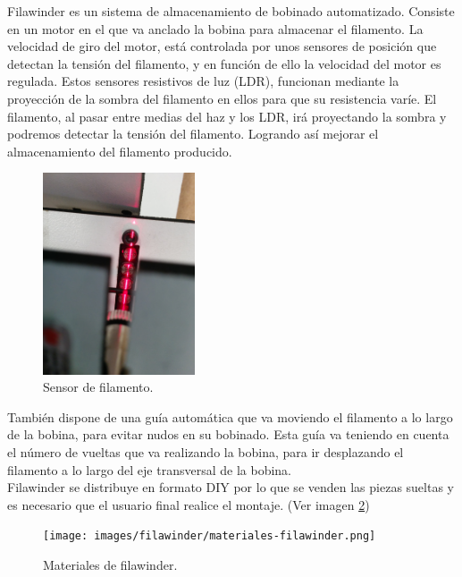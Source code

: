 Filawinder es un sistema de almacenamiento de bobinado automatizado. Consiste en un motor en el que va anclado la bobina para almacenar el filamento. La velocidad de giro del motor, está controlada por unos sensores de posición que detectan la tensión del filamento, y en función de ello la velocidad del motor es regulada. Estos sensores resistivos de luz (LDR), funcionan mediante la proyección de la sombra del filamento en ellos para que su resistencia varíe. El filamento, al pasar entre medias del haz y los LDR, irá proyectando la sombra y podremos detectar la tensión del filamento. Logrando así mejorar el almacenamiento del filamento producido.

    \begin{figure}[H]
            \centering
            \includegraphics[width=0.4\textwidth]{images/filawinder/Sensor-filamento.jpg}
            \caption{Sensor de filamento.}
            \label{fig:winder_sensor}
    \end{figure}

También dispone de una guía automática que va moviendo el filamento a lo largo de la bobina, para evitar nudos en su bobinado. Esta guía va teniendo en cuenta el número de vueltas que va realizando la bobina, para ir desplazando el filamento a lo largo del eje transversal de la bobina.\\

Filawinder se distribuye en formato DIY por lo que se venden las piezas sueltas y es necesario que el usuario final realice el montaje. (Ver imagen \ref{fig:winder_material})
    \begin{figure}[H]
            \centering
            \texttt{[image: images/filawinder/materiales-filawinder.png]}
            \caption{Materiales de filawinder.}
            \label{fig:winder_material}
    \end{figure}

